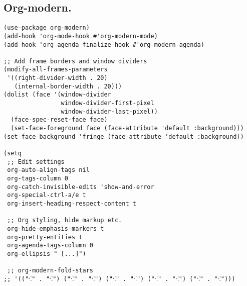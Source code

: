 \documentclass[11pt]{article}
\begin{document}
\subsection{Org-modern.}
\label{sec:org784647e}
\begin{verbatim}
(use-package org-modern)
(add-hook 'org-mode-hook #'org-modern-mode)
(add-hook 'org-agenda-finalize-hook #'org-modern-agenda)

;; Add frame borders and window dividers
(modify-all-frames-parameters
 '((right-divider-width . 20)
   (internal-border-width . 20)))
(dolist (face '(window-divider
                window-divider-first-pixel
                window-divider-last-pixel))
  (face-spec-reset-face face)
  (set-face-foreground face (face-attribute 'default :background)))
(set-face-background 'fringe (face-attribute 'default :background))

(setq
 ;; Edit settings
 org-auto-align-tags nil
 org-tags-column 0
 org-catch-invisible-edits 'show-and-error
 org-special-ctrl-a/e t
 org-insert-heading-respect-content t

 ;; Org styling, hide markup etc.
 org-hide-emphasis-markers t
 org-pretty-entities t
 org-agenda-tags-column 0
 org-ellipsis " [...]")

 ;; org-modern-fold-stars
;; '(("⁖" . "⁖") ("⁖" . "⁖") ("⁖" . "⁖") ("⁖" . "⁖") ("⁖" . "⁖")))
\end{verbatim}
\end{document}
